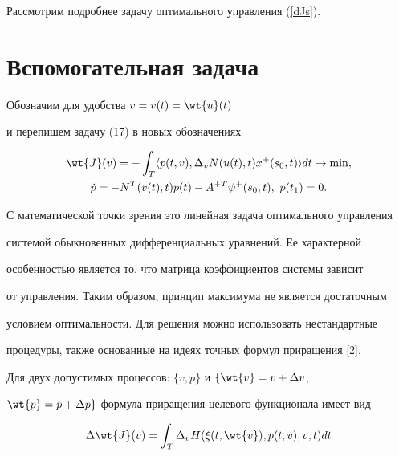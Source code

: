 Рассмотрим подробнее задачу оптимального управления (\ref{dJs}).





\section{Вспомогательная задача}





Обозначим для удобства $v=v(t)=\wt{u}(t)$


и перепишем задачу (17) в новых обозначениях


\begin{gather}


\wt{J}(v)=-\int_T \la p(t,v),


\Delta_v N(u(t),t)x^+(s_0,t)\ra dt\rightarrow\min,\notag \\


%


\Dot{p}= -N^T(v(t),t)p(t)-A^{+T}\psi^+(s_0,t), \ p(t_1)=0.


\label {18}


\end{gather}





С математической точки зрения это линейная задача оптимального управления


системой обыкновенных дифференциальных уравнений. Ее характерной


особенностью является то, что матрица коэффициентов системы зависит


от управления. Таким образом, принцип максимума не является достаточным


условием оптимальности. Для решения можно использовать нестандартные


процедуры, также основанные на идеях точных формул приращения [2].





Для двух допустимых процессов: $\{v,p\}$ и $\{\wt{v}=v+\Delta v$,


$\wt{p}=p+\Delta p\}$ формула приращения целевого функционала имеет вид


\begin{equation}


\Delta \wt{J}(v)=\int_T\Delta_v H(\xi(t,\wt{v}),p(t,v),v,t)dt


\label{dJv}


\end{equation}


